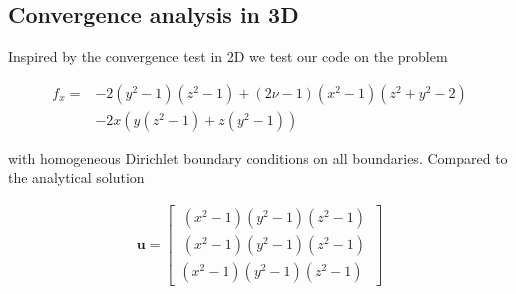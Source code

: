 

\subsection{Convergence analysis in 3D}

Inspired by the convergence test in 2D we test our code on the problem 

\begin{align}
f_x = &-2(y^2-1)(z^2-1) + (2 \nu -1)(x^2-1)(z^2 +y^2-2) \\
 &-2x(y(z^2-1) + z(y^2-1)) 
\end{align}

with homogeneous Dirichlet boundary conditions on all boundaries. Compared to the analytical solution 

\begin{align}
\bm{u} = \begin{bmatrix}
\, (x^2-1)(y^2-1)(z^2-1) \, \\
\, (x^2-1)(y^2-1)(z^2-1) \, \\
(x^2-1)(y^2-1)(z^2-1)
\end{bmatrix}
\end{align}

